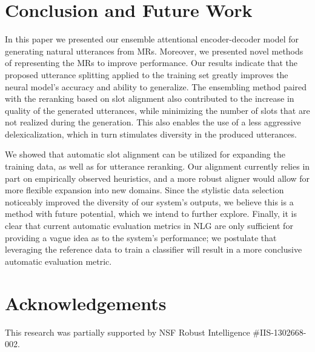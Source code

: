 \documentclass[11pt,a4paper]{article}
\begin{document}
\section{Conclusion and Future Work}
\label{sec:conclusion}


In this paper we presented our ensemble attentional encoder-decoder model for generating natural utterances from MRs. Moreover, we presented novel methods of representing the MRs to improve performance. Our results indicate that the proposed utterance splitting applied to the training set greatly improves the neural model's accuracy and ability to generalize. The ensembling method paired with the reranking based on slot alignment also contributed to the increase in quality of the generated utterances, while minimizing the number of slots that are not realized during the generation. This also enables the use of a less aggressive delexicalization, which in turn stimulates diversity in the produced utterances.

We showed that automatic slot alignment can be utilized for expanding the training data, as well as for utterance reranking. Our alignment currently relies in part on empirically observed heuristics, and a more robust aligner would allow for more flexible expansion into new domains. Since the stylistic data selection noticeably improved the diversity of our system's outputs, we believe this is a method with future potential, which we intend to further explore. Finally, it is clear that current automatic evaluation metrics in NLG are only sufficient for providing a vague idea as to the system's performance; we postulate that leveraging the reference data to train a classifier will result in a more conclusive automatic evaluation metric.



\section*{Acknowledgements}
This research was partially supported by NSF Robust Intelligence \#IIS-1302668-002.




\end{document}
